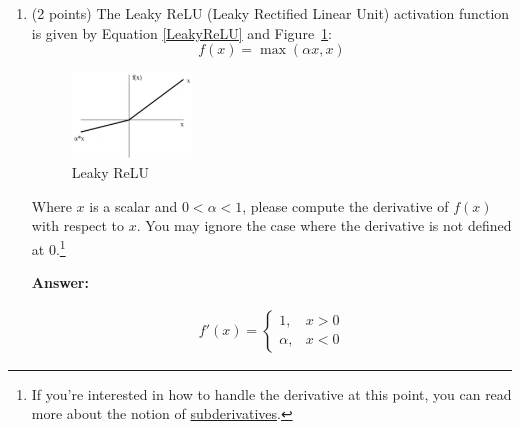 \documentclass{article}
\newenvironment{answer}{
    {\bf Answer:} \sf \begingroup\color{red}
}{\endgroup}%
\begin{document}
\begin{enumerate}[label=(\alph*)]
\begin{shaded}
\begin{answer}
According to shape convention, 
\begin{align}
    \frac{\partial }{\partial \bm U} J &=
    \begin{pmatrix}
        \vert	&	\vert	&	\dots	&	\vert	\\
        \frac{\partial J}{\partial \bm u_1}	&	\frac{\partial J}{\partial \bm u_2}	&	\dots	&	\frac{\partial J}{\partial \bm u_{|V|}}	\\
        \vert	&	\vert	&	\dots	&	\vert	
    \end{pmatrix}
\end{align}
\end{answer}
\end{shaded}

\item (2 points) The Leaky ReLU (Leaky Rectified Linear Unit) activation function is given by Equation \ref{LeakyReLU} and Figure~\ref{fig:leaky_relu}:
\begin{equation}
    \label{LeakyReLU}
    f(x) = \max(\alpha x, x)
\end{equation}

\begin{figure}[h]
    \centering
    \includegraphics[width=0.3\textwidth]{leaky_relu_graph.png}
    \caption{Leaky ReLU}
    \label{fig:leaky_relu}
\end{figure}

Where $x$ is a scalar and $0<\alpha <1$, please compute the derivative of $f(x)$ with respect to $x$. You may ignore the case where the derivative is not defined at 0.\footnote{If you're interested in how to handle the derivative at this point, you can read more about the notion of \hyperref[https://en.wikipedia.org/wiki/Subderivative]{subderivatives}.}

\begin{shaded}
\begin{answer}
\begin{align}
    f'(x) = 
    \begin{cases}
        1,	&	x>0	\\
        \alpha,	&	x<0
    \end{cases}
\end{align}
\end{answer}
\end{shaded}


\end{enumerate}
\end{document}
